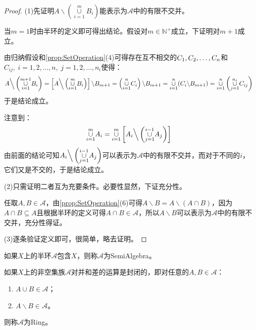 \begin{proof}
	(1)先证明$A\backslash\left(\underset{i=1}{\overset{m}{\cup}}B_i\right)$能表示为$\mathscr{A}$中的有限不交并。\par
	当$m=1$时由半环的定义即可得出结论。假设对$m\in\mathbb{N}^+$成立，下证明对$m+1$成立。\par
	由归纳假设和\cref{prop:SetOperation}(4)可得存在互不相交的$C_1, C_2, \dots, C_{n}$和$C_{ij},\;i=1,2,\dots,n,\;j=1,2,\dots,n_i$使得：
	\begin{equation*}
		A\Big\backslash\left(\underset{i=1}{\overset{m+1}{\cup}}B_i\right)=\left[A\Big\backslash\left(\underset{i=1}{\overset{m}{\cup}}B_i\right)\right]\backslash B_{m+1}=\left(\underset{i=1}{\overset{n}{\cup}}C_i\right)\backslash B_{m+1}=\underset{i=1}{\overset{n}{\cup}}(C_i\backslash B_{m+1})=\underset{i=1}{\overset{n}{\cup}}\left(\underset{j=1}{\overset{n_i}{\cup}}C_{ij}\right)
	\end{equation*}
	于是结论成立。\par
	注意到：
	\begin{equation*}
		\underset{i=1}{\overset{m}{\cup}}A_i=\underset{i=1}{\overset{m}{\cup}}\left[A_i\Big\backslash\left(\underset{j=1}{\overset{i-1}{\cup}}A_j\right)\right]
	\end{equation*}
	由前面的结论可知$A_i\Big\backslash\left(\underset{j=1}{\overset{i-1}{\cup}}A_j\right)$可以表示为$\mathscr{A}$中的有限不交并，而对于不同的$i$，它们又是不交的，于是结论成立。\par
	(2)只需证明二者互为充要条件。必要性显然，下证充分性。\par
	任取$A,B\in\mathscr{A}$，由\cref{prop:SetOperation}(6)可得$A\backslash B=A\backslash(A\cap B)$，因为$A\cap B\subseteq A$且根据半环的定义可得$A\cap B\in\mathscr{A}$，所以$A\backslash B$可以表示为$\mathscr{A}$中的有限不交并，充分性得证。\par
	(3)逐条验证定义即可，很简单，略去证明。
\end{proof}
\begin{definition}
	如果$X$上的半环$\mathscr{A}$包含$X$，则称$\mathscr{A}$为\gls{SemiAlgebra}。
\end{definition}
\begin{definition}
	如果$X$上的非空集族$\mathscr{A}$对并和差的运算是封闭的，即对任意的$A,B\in\mathscr{A}$：
	\begin{enumerate}
		\item $A\cup B\in\mathscr{A}$；
		\item $A\backslash B\in\mathscr{A}$。
	\end{enumerate}
	则称$\mathscr{A}$为\gls{Ring}。
\end{definition}
